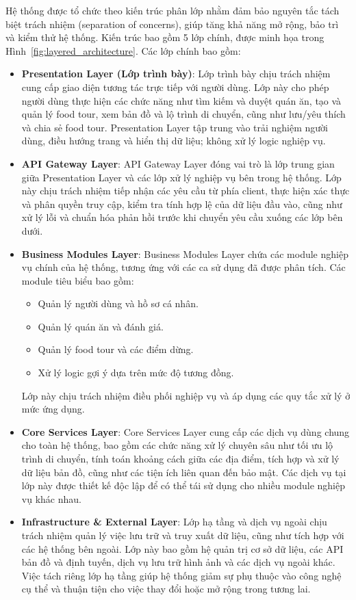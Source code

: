 Hệ thống được tổ chức theo kiến trúc phân lớp nhằm đảm bảo nguyên tắc tách biệt trách nhiệm (separation of concerns), giúp tăng khả năng mở rộng, bảo trì và kiểm thử hệ thống. Kiến trúc bao gồm 5 lớp chính, được minh họa trong Hình~\ref{fig:layered_architecture}. Các lớp chính bao gồm:
\begin{itemize}[label=\textbullet]
    \item \textbf{Presentation Layer (Lớp trình bày)}: Lớp trình bày chịu trách nhiệm cung cấp giao diện tương tác trực tiếp với người dùng. Lớp này cho phép người dùng thực hiện các chức năng như tìm kiếm và duyệt quán ăn, tạo và quản lý food tour, xem bản đồ và lộ trình di chuyển, cũng như lưu/yêu thích và chia sẻ food tour.
Presentation Layer tập trung vào trải nghiệm người dùng, điều hướng trang và hiển thị dữ liệu; không xử lý logic nghiệp vụ.
    \item \textbf{API Gateway Layer}: API Gateway Layer đóng vai trò là lớp trung gian giữa Presentation Layer và các lớp xử lý nghiệp vụ bên trong hệ thống. Lớp này chịu trách nhiệm tiếp nhận các yêu cầu từ phía client, thực hiện xác thực và phân quyền truy cập, kiểm tra tính hợp lệ của dữ liệu đầu vào, cũng như xử lý lỗi và chuẩn hóa phản hồi trước khi chuyển yêu cầu xuống các lớp bên dưới.
    \item \textbf{Business Modules Layer}: Business Modules Layer chứa các module nghiệp vụ chính của hệ thống, tương ứng với các ca sử dụng đã được phân tích. Các module tiêu biểu bao gồm:
    \begin{itemize}[label=\textbullet]
        \item Quản lý người dùng và hồ sơ cá nhân.
        \item Quản lý quán ăn và đánh giá.
        \item Quản lý food tour và các điểm dừng.
        \item Xử lý logic gợi ý dựa trên mức độ tương đồng.
    \end{itemize}
    Lớp này chịu trách nhiệm điều phối nghiệp vụ và áp dụng các quy tắc xử lý ở mức ứng dụng.
    \item \textbf{Core Services Layer}: Core Services Layer cung cấp các dịch vụ dùng chung cho toàn hệ thống, bao gồm các chức năng xử lý chuyên sâu như tối ưu lộ trình di chuyển, tính toán khoảng cách giữa các địa điểm, tích hợp và xử lý dữ liệu bản đồ, cũng như các tiện ích liên quan đến bảo mật.
Các dịch vụ tại lớp này được thiết kế độc lập để có thể tái sử dụng cho nhiều module nghiệp vụ khác nhau.
    \item \textbf{Infrastructure \& External Layer}: Lớp hạ tầng và dịch vụ ngoài chịu trách nhiệm quản lý việc lưu trữ và truy xuất dữ liệu, cũng như tích hợp với các hệ thống bên ngoài. Lớp này bao gồm hệ quản trị cơ sở dữ liệu, các API bản đồ và định tuyến, dịch vụ lưu trữ hình ảnh và các dịch vụ ngoài khác.
Việc tách riêng lớp hạ tầng giúp hệ thống giảm sự phụ thuộc vào công nghệ cụ thể và thuận tiện cho việc thay đổi hoặc mở rộng trong tương lai.
\end{itemize}

